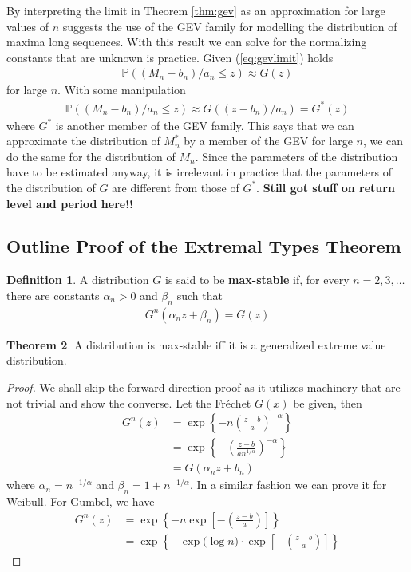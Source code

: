 \documentclass[a4paper,10pt]{article}
\theoremstyle{definition}
\newtheorem{thm}{Theorem}[section]
\newtheorem{defn}[thm]{Definition}
\numberwithin{equation}{section}
\begin{document}
By interpreting the limit in Theorem \ref{thm:gev} as an approximation for large values of $n$ suggests the use of the GEV family for modelling the distribution of maxima long sequences. With this result we can solve for the normalizing constants that are unknown is practice. Given (\ref{eq:gevlimit}) holds
\begin{align*}
\mathbb{P}((M_n-b_n)/a_n\leq z) \approx G(z)
\end{align*}
for large $n$. With some manipulation 
\begin{align*}
\mathbb{P}((M_n-b_n)/a_n\leq z) \approx G((z-b_n)/a_n) = G^\ast(z)
\end{align*}
where $G^\ast$ is another member of the GEV family. This says that we can approximate the distribution of $M_n^\ast$ by a member of the GEV for large $n$, we can do the same for the distribution of $M_n$. {\color{red} Since the parameters of the distribution have to be estimated anyway, it is irrelevant in practice that the parameters of the distribution of $G$ are different from those of $G^\ast$}. \textbf{Still got stuff on return level and period here!!}

\subsection{Outline Proof of the Extremal Types Theorem}

\begin{defn}
A distribution $G$ is said to be \textbf{max-stable} if, for every $n=2,3,\ldots$ there are constants $\alpha_n>0$ and $\beta_n$ such that
\begin{align*}
G^n(\alpha_nz+\beta_n) = G(z)
\end{align*}
\end{defn}

\begin{thm}\label{thm:maxstablegev}
A distribution is max-stable iff it is a generalized extreme value distribution.
\begin{proof}
We shall skip the forward direction proof as it utilizes machinery that are not trivial and show the converse. Let the Fr\'echet $G(x)$ be given, then 	
\begin{align*}
G^n(z) &= \exp\left\{-n\left(\frac{z-b}{a}\right)^{-\alpha}\right\}\\
&= \exp\left\{-\left(\frac{z-b}{an^{1/\alpha}}\right)^{-\alpha}\right\}\\
&=G(\alpha_nz+b_n)
\end{align*}
where $\alpha_n = n^{-1/\alpha}$ and $\beta_n = 1 +  n^{-1/\alpha}$. In a similar fashion we can prove it for Weibull. For Gumbel, we have
\begin{align*}
G^n(z) &= \exp\left\{-n\exp\left[-\left(\frac{z-b}{a}\right)\right]\right\} \\
&= \exp\left\{-\exp\Big(\log n\Big)\cdot\exp\left[-\left(\frac{z-b}{a}\right)\right]\right\}
\end{align*}
\end{proof}
\end{thm}
\end{document}
